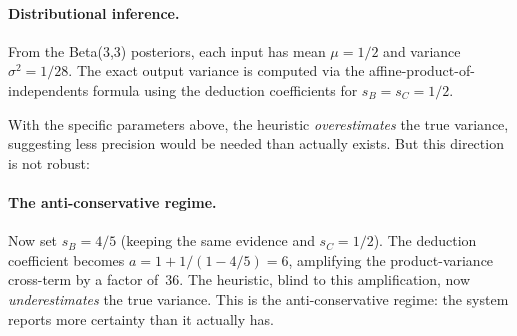 \documentclass[11pt,openany]{report}
\begin{document}
\paragraph{Distributional inference.}  From the Beta(3,3) posteriors, each input
has mean $\mu = 1/2$ and variance $\sigma^2 = 1/28$.  The exact output
variance is computed via the affine-product-of-independents formula using
the deduction coefficients for $s_B = s_C = 1/2$.

With the specific parameters above, the heuristic \emph{overestimates} the
true variance, suggesting less precision would be needed than actually
exists.  But this direction is not robust:

\paragraph{The anti-conservative regime.}  Now set $s_B = 4/5$ (keeping the
same evidence and $s_C = 1/2$).  The deduction coefficient becomes
$a = 1 + 1/(1 - 4/5) = 6$, amplifying the product-variance cross-term by a
factor of~36.  The heuristic, blind to this amplification, now
\emph{underestimates} the true variance.  This is the anti-conservative
regime: the system reports more certainty than it actually has.
\end{document}
